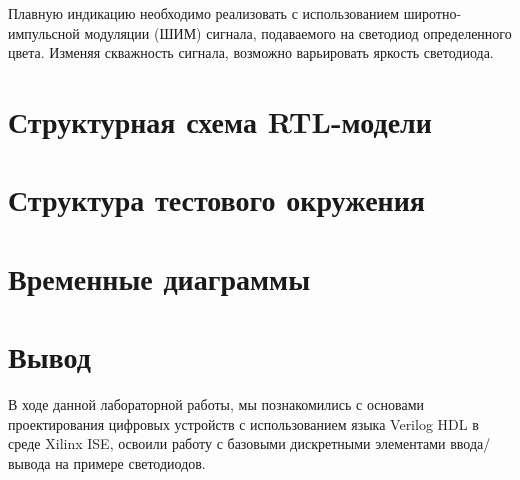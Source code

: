 Плавную индикацию необходимо реализовать с использованием широтно-
импульсной модуляции (ШИМ) сигнала, подаваемого на светодиод определенного
цвета. Изменяя скважность сигнала, возможно варьировать яркость светодиода.

\section{Структурная схема RTL-модели}

\section{Структура тестового окружения}

\section{Временные диаграммы}

\section{Вывод}
В ходе данной лабораторной работы, мы познакомились с основами проектирования цифровых устройств с использованием языка Verilog HDL в среде Xilinx ISE,
освоили работу с базовыми дискретными элементами ввода/вывода на примере светодиодов.

